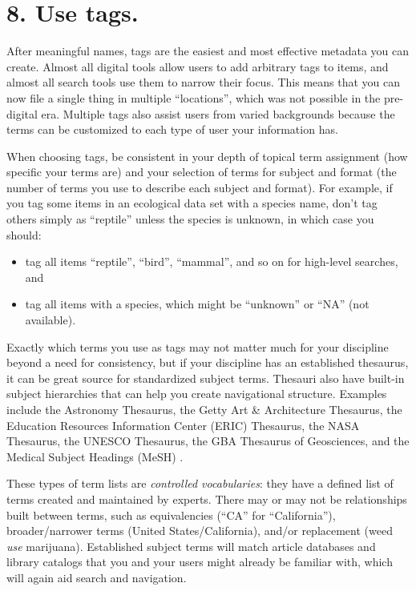 \documentclass[10pt,letterpaper]{article}
\newcommand{\rulemajor}[1]{\section*{#1}}
\begin{document}
\rulemajor{8. Use tags.}

After meaningful names, tags are the easiest and most effective metadata you can
create.  Almost all digital tools allow users to add arbitrary tags to items,
and almost all search tools use them to narrow their focus. This means that you
can now file a single thing in multiple ``locations'', which was not possible in
the pre-digital era. Multiple tags also assist users from varied backgrounds
because the terms can be customized to each type of user your information has.

When choosing tags, be consistent in your depth of topical term assignment (how
specific your terms are) and your selection of terms for subject and format (the
number of terms you use to describe each subject and format). For example, if
you tag some items in an ecological data set with a species name, don't tag
others simply as ``reptile'' unless the species is unknown, in which case you
should:

\begin{itemize}

\item
  tag all items ``reptile'', ``bird'', ``mammal'', and so on for high-level
  searches, and

\item
  tag all items with a species, which might be ``unknown'' or ``NA'' (not
  available).

\end{itemize}

Exactly which terms you use as tags may not matter much for your discipline
beyond a need for consistency, but if your discipline has an established
thesaurus, it can be great source for standardized subject terms. Thesauri also
have built-in subject hierarchies that can help you create navigational
structure. Examples include the Astronomy Thesaurus, the Getty Art \&
Architecture Thesaurus, the Education Resources Information Center (ERIC)
Thesaurus, the NASA Thesaurus, the UNESCO Thesaurus, the GBA Thesaurus of
Geosciences, and the Medical Subject Headings (MeSH) \cite{ASI2020}.

These types of term lists are \emph{controlled vocabularies}: they have a
defined list of terms created and maintained by experts. There may or may not be
relationships built between terms, such as equivalencies (``CA'' for
``California''), broader/narrower terms (United States/California), and/or
replacement (weed \emph{use} marijuana). Established subject terms will match
article databases and library catalogs that you and your users might already be
familiar with, which will again aid search and navigation.
\end{document}
